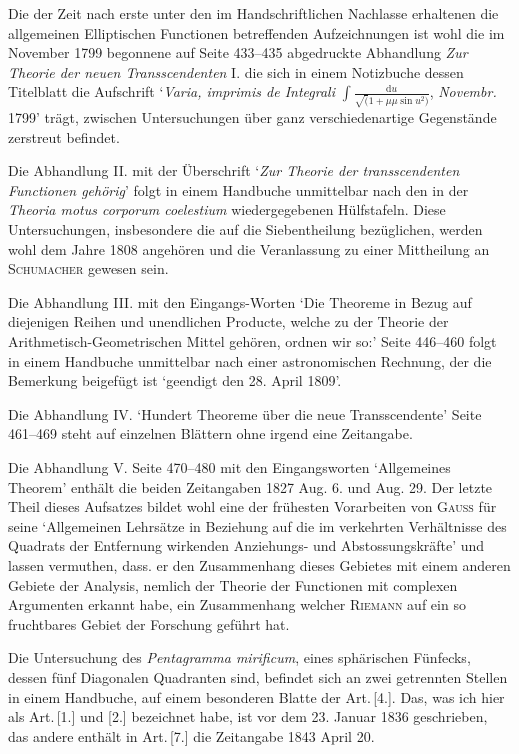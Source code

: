 \medskip
Die der Zeit nach erste unter den im Handschriftlichen Nachlasse erhaltenen die allgemeinen Elliptischen Functionen betreffenden Aufzeichnungen ist wohl die im November 1799 begonnene auf Seite 433--435 abgedruckte Abhandlung \textit{Zur Theorie der neuen Transscendenten} I. die sich in einem Notizbuche dessen Titelblatt die Aufschrift `\textit{Varia, imprimis de Integrali} \(\displaystyle\int\frac{\mathrm{d}u}{\surd(1+\mu\mu\sin u^{2})}\), \textit{Novembr.} 1799' trägt, zwischen Untersuchungen über ganz verschiedenartige Gegenstände zerstreut befindet.

\medskip
Die Abhandlung II. mit der Überschrift `\textit{Zur Theorie der transscendenten Functionen gehörig}' folgt in einem Handbuche unmittelbar nach den in der \textit{Theoria motus corporum coelestium} wiedergegebenen Hülfstafeln. Diese Untersuchungen, insbesondere die auf die Siebentheilung bezüglichen, werden wohl dem Jahre 1808 angehören und die Veranlassung zu einer Mittheilung an \textsc{Schumacher} gewesen sein.

\medskip
Die Abhandlung III. mit den Eingangs-Worten `Die Theoreme in Bezug auf diejenigen Reihen und unendlichen Producte, welche zu der Theorie der Arithmetisch-Geometrischen Mittel gehören, ordnen wir so:' Seite 446--460 folgt in einem Handbuche unmittelbar nach einer astronomischen Rechnung, der die Bemerkung beigefügt ist `geendigt den 28. April 1809'.

\medskip
Die Abhandlung IV. `Hundert Theoreme über die neue Transscendente' Seite 461--469 steht auf einzelnen Blättern ohne irgend eine Zeitangabe.

\medskip
Die Abhandlung V. Seite 470--480 mit den Eingangsworten `Allgemeines Theorem' enthält die beiden Zeitangaben 1827 Aug. 6. und Aug. 29. Der letzte Theil dieses Aufsatzes bildet wohl eine der frühesten Vorarbeiten von \textsc{Gauss} für seine `Allgemeinen Lehrsätze in Beziehung auf die im verkehrten Verhältnisse des Quadrats der Entfernung wirkenden Anziehungs- und Abstossungskräfte' und lassen vermuthen, dass. er den Zusammenhang dieses Gebietes mit einem anderen Gebiete der Analysis, nemlich der Theorie der Functionen mit complexen Argumenten erkannt habe, ein Zusammenhang welcher \textsc{Riemann} auf ein so fruchtbares Gebiet der Forschung geführt hat.

\medskip
Die Untersuchung des \textit{Pentagramma mirificum}, eines sphärischen Fünfecks, dessen fünf Diagonalen Quadranten sind, befindet sich an zwei getrennten Stellen in einem Handbuche, auf einem besonderen Blatte der Art.\,[4.]. Das, was ich hier als Art.\,[1.] und [2.] bezeichnet habe, ist vor dem 23. Januar 1836 geschrieben, das andere enthält in Art.\,[7.] die Zeitangabe 1843 April 20.

